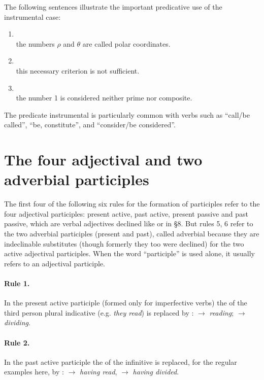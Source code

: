 The following sentences illustrate the important predicative use of the instrumental case:

\begin{enumerate}[label=\arabic*),start=12]
\item {}\\
      the numbers $\rho$ and $\theta$ are called polar coordinates.
\item {}\\
      this necessary criterion is not sufficient.
\item {}\\
      the number 1 is considered neither prime nor composite.
\end{enumerate}

The predicate instrumental is particularly common with verbs such as  ``call/be called'',  ``be, constitute'', and  ``consider/be considered''.

\section{The four adjectival and two adverbial participles}

The first four of the following six rules for the formation of participles refer to the four adjectival participles: present active, past active, present passive and past passive, which are verbal adjectives declined like  or  in §8. But rules 5, 6 refer to the two adverbial participles (present and past), called adverbial because they are indeclinable substitutes (though formerly they too were declined) for the two active adjectival participles. When the word ``participle'' is used alone, it usually refers to an adjectival participle.

\paragraph{Rule 1.} In the present active participle (formed only for imperfective verbs) the  of the third person plural indicative (e.g.  \emph{they read}) is replaced by :  \(\to\)  \emph{reading};  \(\to\)  \emph{dividing}.

\paragraph{Rule 2.} In the past active participle the  of the infinitive is replaced, for the regular examples here, by :  \(\to\)  \emph{having read},  \(\to\)  \emph{having divided}.

